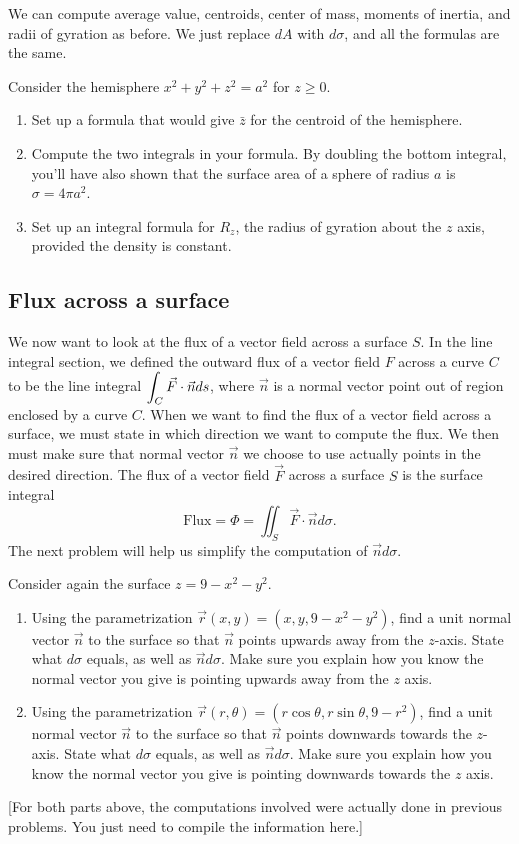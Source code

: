 We can compute average value, centroids, center of mass, moments of inertia, and radii of gyration as before.  We just replace $dA$ with $d\sigma$, and all the formulas are the same. 


\begin{problem}
 Consider the hemisphere $x^2+y^2+z^2=a^2$ for $z\geq 0$. 
\begin{enumerate}
 \item Set up a formula that would give $\bar z$ for the centroid of the hemisphere.
 \item Compute the two integrals in your formula. By doubling the bottom integral, you'll have also shown that the surface area of a sphere of radius $a$ is $\sigma = 4\pi a^2$.
 \item Set up an integral formula for $R_z$, the radius of gyration about the $z$ axis, provided the density is constant.
\end{enumerate}
\end{problem}

\subsection{Flux across a surface}

We now want to look at the flux of a vector field across a surface $S$.  In the line integral section, we defined the outward flux of a vector field $F$ across a curve $C$ to be the line integral $\displaystyle \int_C \vec F\cdot \vec n ds$, where $\vec n$ is a normal vector point out of region enclosed by a curve $C$. When we want to find the flux of a vector field across a surface, we must state in which direction we want to compute the flux. We then must make sure that normal vector $\vec n$ we choose to use actually points in the desired direction. The flux of a vector field $\vec F$ across a surface $S$ is the surface integral
$$\text{Flux}=\Phi 
= \iint_S \vec F\cdot \vec n d\sigma 
.$$
The next problem will help us simplify the computation of $\vec nd\sigma$.

\begin{problem}
Consider again the surface $z=9-x^2-y^2$. 
\begin{enumerate}
 \item Using the parametrization $\vec r(x,y) =(x,y,9-x^2-y^2)$, find a unit normal vector $\vec n$ to the surface so that $\vec n$ points upwards away from the $z$-axis. State what $d\sigma$ equals, as well as $\vec n d\sigma$. 
Make sure you explain how you know the normal vector you give is pointing upwards away from the $z$ axis.
 \item Using the parametrization $\vec r(r,\theta) =(r\cos \theta,r\sin\theta ,9-r^2)$, find a unit normal vector $\vec n$ to the surface so that $\vec n$ points downwards towards the $z$-axis. State what $d\sigma$ equals, as well as $\vec n d\sigma$.  
Make sure you explain how you know the normal vector you give is pointing downwards towards the $z$ axis.
\end{enumerate}
[For both parts above, the computations involved were actually done in previous problems. You just need to compile the information here.]
\end{problem}


